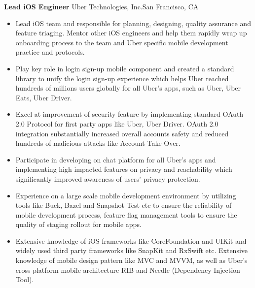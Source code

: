 \documentclass[10pt,letterpaper,sans]{moderncv}        %
\begin{document}
{\textbf{Lead iOS Engineer}}
{Uber Technologies, Inc.}{San Francisco, CA}{}{
\begin{itemize} 
\item Lead iOS team and responsible for planning, designing, quality assurance and feature triaging. Mentor other iOS engineers and help them rapidly wrap up onboarding process to the team and Uber specific mobile development practice and protocols. 
\item Play key role in login sign-up mobile component and created a standard library to unify the login sign-up experience which helps Uber reached hundreds of millions users globally for all Uber's apps, such as Uber, Uber Eats, Uber Driver. 
\item Excel at improvement of security feature by implementing standard OAuth 2.0 Protocol for first party apps like Uber, Uber Driver. OAuth 2.0 integration substantially increased overall accounts safety and reduced hundreds of malicious attacks like Account Take Over.
\item Participate in developing on chat platform for all Uber's apps and implementing high impacted features on privacy and reachability which significantly improved awareness of users' privacy protection. 
\item Experience on a large scale mobile development environment by utilizing tools like Buck, Bazel and Snapshot Test etc to ensure the reliability of mobile development process, feature flag management tools to ensure the quality of staging rollout for mobile apps. 
\item Extensive knowledge of iOS frameworks like CoreFoundation and UIKit and widely used third party frameworks like SnapKit and RxSwift etc. Extensive knowledge of mobile design pattern like MVC and MVVM, as well as Uber's cross-platform mobile architecture RIB and Needle (Dependency Injection Tool).
\end{itemize}} 
\end{document}

